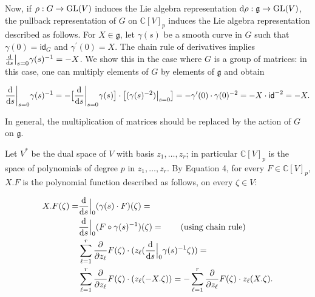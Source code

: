 \documentclass[10pt,a4paper]{article}
\begin{document}
Now, if $\rho:G\to\textnormal{GL}(V)$ induces the Lie algebra representation $\textnormal{d}\rho:\mathfrak{g}\to\textnormal{GL}(V)$, the pullback representation of $G$ on $\mathbb{C}[V]_{p}$ induces the Lie algebra representation described as follows. For $X\in\mathfrak{g}$, let $\gamma(s)$ be a smooth curve in $G$ such that $\gamma(0)=\mathsf{id}_{G}$ and $\gamma^{\prime}(0)=X$. The chain rule of derivatives implies $\frac{\textnormal{d}}{\textnormal{d}s}\big{|}_{s=0}\gamma(s)^{-1}=-X$. We show this in the case where $G$ is a group of matrices: in this case, one can multiply elements of $G$ by elements of $\mathfrak{g}$ and obtain



\[\begin{aligned}
\frac{\textnormal{d}}{\textnormal{d}s}\bigg{|}_{s=0}\gamma(s)^{-1}=-\bigl{[}\frac{\textnormal{d}}{\textnormal{d}s}\bigg{|}_{s=0}\gamma(s)\bigr{]}\cdot\bigl{[}(\gamma(s)^{-2})\big{|}_{s=0}\bigr{]}=-\gamma^{\prime}(0)\cdot\gamma(0)^{-2}=-X\cdot\mathsf{id}^{-2}=-X.
\end{aligned}\]


In general, the multiplication of matrices should be replaced by the action of $G$ on $\mathfrak{g}$.





Let $V^{*}$ be the dual space of $V$ with basis $z_{1},\ldots,z_{r}$; in particular $\mathbb{C}[V]_{p}$ is the space of polynomials of degree $p$ in $z_{1},\ldots,z_{r}$. By Equation 4, for every $F\in\mathbb{C}[V]_{p}$, $X.F$ is the polynomial function described as follows, on every $\zeta\in V$:



\[\begin{aligned}
\displaystyle X.F(\zeta)= & \displaystyle\frac{\textnormal{d}}{\textnormal{d}s}\Big{|}_{0}(\gamma(s)\cdot F)(\zeta)= \\
 & \displaystyle\frac{\textnormal{d}}{\textnormal{d}s}\Big{|}_{0}(F\circ\gamma(s)^{-1})(\zeta)=\qquad(\text{using chain rule}) \\
 & \displaystyle\sum_{\ell=1}^{r}\frac{\partial}{\partial z_{\ell}}F(\zeta)\cdot(z_{\ell}(\frac{\textnormal{d}}{\textnormal{d}s}\Big{|}_{0}\gamma(s)^{-1}\zeta))= \\
 & \displaystyle\sum_{\ell=1}^{r}\frac{\partial}{\partial z_{\ell}}F(\zeta)\cdot(z_{\ell}(-X.\zeta))=-\sum_{\ell=1}^{r}\frac{\partial}{\partial z_{\ell}}F(\zeta)\cdot z_{\ell}(X.\zeta).
\end{aligned}\]
\end{document}

